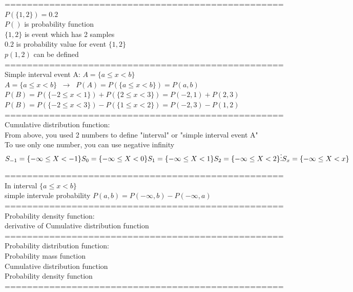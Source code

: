 \documentclass{article}
\begin{document}
================================================== \\
$P(\{1,2\})=0.2$ \\ 
$P()$ is probability function \\ 
$\{1,2\}$ is event which has 2 samples \\ 
$0.2$ is probability value for event $\{1,2\}$ \\ 

$p(1,2)$ can be defined \\ 

================================================== \\
Simple interval event A: $A=\{a\le x <b\}$ \\ 

$A = \{ a \leq x < b \} \;\; \rightarrow \;\; P(A) = P(\{ a \leq x < b \}) = P(a, b)$ \\ 

$P(B) = P(\{ -2 \leq x < 1\}) + P(\{2 \leq x < 3\}) = P(-2, 1) + P(2, 3)$ \\ 

$P(B) = P(\{ -2 \leq x < 3 \}) - P(\{ 1 \leq x < 2\}) = P(-2, 3) - P(1, 2)$ \\ 

================================================== \\
Cumulative distribution function: \\ 
From above, you used 2 numbers to define "interval" or "simple interval event A" \\ 

To use only one number, you can use negative infinity \\ 

$
S_{-1} = \{ -\infty \leq X < -1 \} \\
S_{0} = \{ -\infty \leq X < 0 \} \\
S_{1} = \{ -\infty \leq X < 1 \} \\
S_{2} = \{ -\infty \leq X < 2 \} \\
\vdots \\
S_{x} = \{ -\infty \leq X < x \} \\$

================================================== \\
In interval $\{ a \leq x < b \}$ \\ 
simple intervale probability $P(a, b) = P(-\infty, b) - P(-\infty, a)$ \\

================================================== \\
Probability density function: \\ 
derivative of Cumulative distribution function \\ 

================================================== \\
Probability distribution function: \\ 
Probability mass function \\ 
Cumulative distribution function \\ 
Probability density function \\ 

================================================== \\
\end{document}

